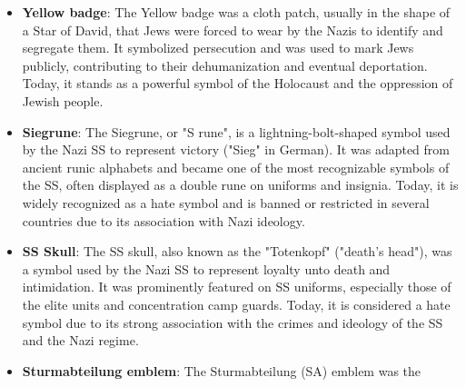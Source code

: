 \begin{itemize}
  Austria, and Slovakia—and is considered hate speech or a criminal act in
  many others if used to promote Nazi ideology.
  \item \textbf{Yellow badge}: The Yellow badge was a cloth patch, usually in
  the shape of a Star of David, that Jews were forced to wear by the Nazis
  to identify and segregate them. It symbolized persecution and was used to
  mark Jews publicly, contributing to their dehumanization and eventual
  deportation. Today, it stands as a powerful symbol of the Holocaust and
  the oppression of Jewish people.
  \item \textbf{Siegrune}: The Siegrune, or "S rune", is a lightning-bolt-shaped
  symbol used by the Nazi SS to represent victory ("Sieg" in German). It was
  adapted from ancient runic alphabets and became one of the most recognizable
  symbols of the SS, often displayed as a double rune on uniforms and insignia.
  Today, it is widely recognized as a hate symbol and is banned or restricted
  in several countries due to its association with Nazi ideology.
  \item \textbf{SS Skull}: The SS skull, also known as the "Totenkopf" ("death's head"),
  was a symbol used by the Nazi SS to represent loyalty unto death and intimidation.
  It was prominently featured on SS uniforms, especially those of the elite units
  and concentration camp guards. Today, it is considered a hate symbol due to
  its strong association with the crimes and ideology of the SS and the Nazi regime.
  \item \textbf{Sturmabteilung emblem}: The Sturmabteilung (SA) emblem was the

\end{itemize}
